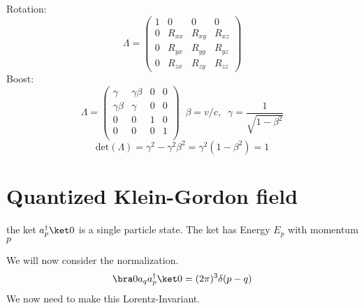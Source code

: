 \documentclass[]{scrartcl}
\begin{document}
Rotation:
\begin{equation}
	\Lambda =
	\begin{pmatrix}
		1 & 0 & 0 & 0\\
		0 & R_{xx} & R_{xy} & R_{xz}\\
		0 & R_{yx} & R_{yy} & R_{yz}\\
		0 & R_{zx} & R_{zy} & R_{zz}
	\end{pmatrix}
\end{equation}
Boost:
\begin{equation}
	\Lambda = 
	\begin{pmatrix}
		\gamma & \gamma\beta & 0 & 0\\
		\gamma\beta & \gamma & 0 & 0\\
		0 & 0 & 1 & 0\\
		0 & 0 & 0 & 1\\
	\end{pmatrix}
	\;\;\beta = v/c, \;\;\gamma = \frac{1}{\sqrt{1-\beta^2}}
\end{equation}
\begin{equation}
	\text{det}(\Lambda) = \gamma^2 - \gamma^2\beta^2 = \gamma^2(1-\beta^2) = 1
\end{equation}

\section{Quantized Klein-Gordon field}
the ket $a_p^\dagger \ket0$ is a single particle state. The ket has Energy $E_p$ with momentum $p$

We will now consider the normalization.
\begin{gather}
	\bra 0 a_q a_p^\dagger \ket 0 = (2\pi)^3\delta(p-q)
\end{gather}
We now need to make this Lorentz-Invariant.
\end{document}
